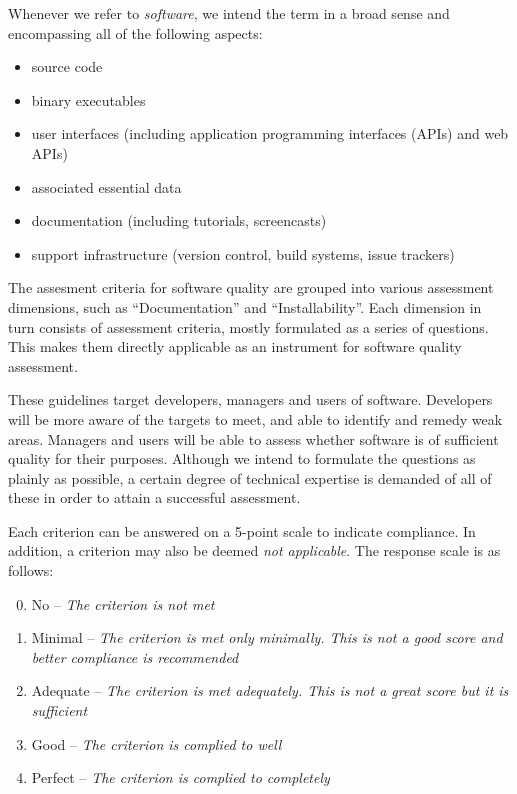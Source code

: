 \documentclass[a4paper,11pt]{article}
\begin{document}
Whenever we refer to \emph{software}, we intend the term in a broad sense and
encompassing all of the following aspects:
\begin{itemize}
    \item source code
    \item binary executables
    \item user interfaces (including application programming interfaces (APIs) and web APIs)
    \item associated essential data
%
%
%
    \item documentation (including tutorials, screencasts)
    \item support infrastructure (version control, build systems, issue trackers)
\end{itemize}

The assesment criteria for software quality are grouped into various assessment
dimensions, such as ``Documentation'' and ``Installability''. Each dimension in turn
consists of assessment criteria, mostly formulated as a series of questions. This
makes them directly applicable as an instrument for software quality
assessment. 

These guidelines target developers, managers and users of software.
Developers will be more aware of the targets to meet, and able to identify and
remedy weak areas. Managers and users will be able to assess whether software
is of sufficient quality for their purposes. Although we intend to
formulate the questions as plainly as possible, a certain degree of technical
expertise is demanded of all of these in order to attain a successful
assessment.

Each criterion can be answered on a 5-point scale to indicate compliance. In
addition, a criterion may also be deemed \emph{not applicable}. The response scale is as follows:

\begin{enumerate}
    \setcounter{enumi}{-1} %
    \item No -- \emph{The criterion is not met}
    \item Minimal -- \emph{The criterion is met only minimally. This is not a good score and better compliance is recommended}
    \item Adequate -- \emph{The criterion is met adequately. This is not a great score but it is sufficient}
    \item Good -- \emph{The criterion is complied to well}
    \item Perfect -- \emph{The criterion is complied to completely}
\end{enumerate}
\end{document}
